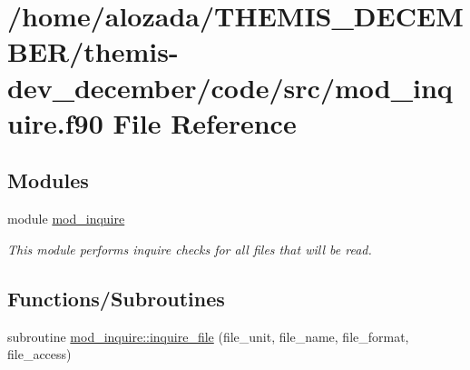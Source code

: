 \hypertarget{mod__inquire_8f90}{}\section{/home/alozada/\+T\+H\+E\+M\+I\+S\+\_\+\+D\+E\+C\+E\+M\+B\+E\+R/themis-\/dev\+\_\+december/code/src/mod\+\_\+inquire.f90 File Reference}
\label{mod__inquire_8f90}
\subsection*{Modules}
\begin{DoxyCompactItemize}
\item 
module \hyperlink{namespacemod__inquire}{mod\+\_\+inquire}
\begin{DoxyCompactList}\small\item\em This module performs inquire checks for all files that will be read. \end{DoxyCompactList}\end{DoxyCompactItemize}
\subsection*{Functions/\+Subroutines}
\begin{DoxyCompactItemize}
\item 
subroutine \hyperlink{namespacemod__inquire_a175fbc61cabe72b93b4f110e72d566c3}{mod\+\_\+inquire\+::inquire\+\_\+file} (file\+\_\+unit, file\+\_\+name, file\+\_\+format, file\+\_\+access)
\end{DoxyCompactItemize}
